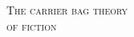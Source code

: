 
\begin{center} %
    \thispagestyle{empty}     %
    \addtocounter{page}{-1}   %
    
    \vspace*{0.75in}
    \scshape      %
    \Large
        The carrier bag theory \\
        of fiction 
        
    \vspace*{\fill} 
\end{center}
